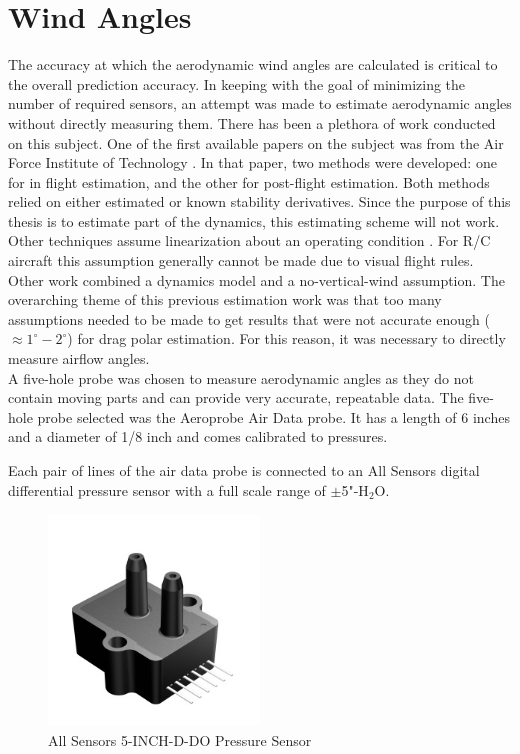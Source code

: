 \section{Wind Angles}
The accuracy at which the aerodynamic wind angles are calculated is critical to the overall prediction accuracy. In keeping with the goal of minimizing the number of required sensors, an attempt was made to estimate aerodynamic angles without directly measuring them. There has been a plethora of work conducted on this subject. One of the first available papers on the subject was from the Air Force Institute of Technology \cite{joseph1988}. In that paper, two methods were developed: one for in flight estimation, and the other for post-flight estimation. Both methods relied on either estimated or known stability derivatives. Since the purpose of this thesis is to estimate part of the dynamics, this estimating scheme will not work. Other techniques assume linearization about an operating condition \cite{morelli2012real}. For R/C aircraft this assumption generally cannot be made due to visual flight rules. Other work \cite{Lie2013} combined a dynamics model and a no-vertical-wind assumption. The overarching theme of this previous estimation work was that too many assumptions needed to be made to get results that were not accurate enough ($\approx1^\circ-2^\circ$) for drag polar estimation. For this reason, it was necessary to directly measure airflow angles.\\

A five-hole probe was chosen to measure aerodynamic angles as they do not contain moving parts and can provide very accurate, repeatable data. The five-hole probe selected was the Aeroprobe Air Data probe. It has a length of 6 inches and a diameter of 1/8 inch and comes calibrated to pressures.

 Each pair of lines of the air data probe is connected to an All Sensors digital differential pressure sensor with a full scale range of $\pm$5"-H$_2$O\cite{allsensorsDDO}.

\begin{figure}[H]
  \caption{All Sensors 5-INCH-D-DO Pressure Sensor} \label{allsensorsPressurePic}
  \centering
    \includegraphics[width=0.5\textwidth]{figures/allsensorsPressure.jpg}
\end{figure}

